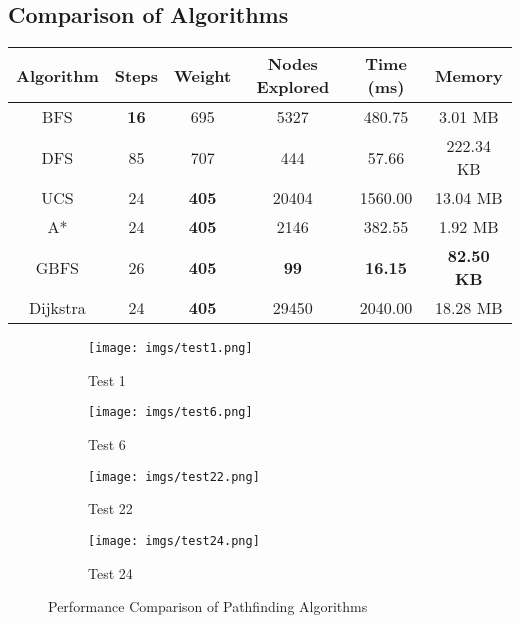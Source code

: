 \subsection{Comparison of Algorithms}

\begin{table}[h]
    \centering
    \begin{tabular}{|c|c|c|c|c|c|}
        \hline
        \textbf{Algorithm} & \textbf{Steps} & \textbf{Weight} & \textbf{Nodes Explored} & \textbf{Time (ms)} & \textbf{Memory}   \\
        \hline
        BFS                & \textbf{16}    & 695             & 5327                    & 480.75             & 3.01 MB           \\
        \hline
        DFS                & 85             & 707             & 444                     & 57.66              & 222.34 KB         \\
        \hline
        UCS                & 24             & \textbf{405}    & 20404                   & 1560.00            & 13.04 MB          \\
        \hline
        A*                 & 24             & \textbf{405}    & 2146                    & 382.55             & 1.92 MB           \\
        \hline
        GBFS               & 26             & \textbf{405}    & \textbf{99}             & \textbf{16.15}     & \textbf{82.50 KB} \\
        \hline
        Dijkstra           & 24             & \textbf{405}    & 29450                   & 2040.00            & 18.28 MB          \\
        \hline
    \end{tabular}
    \label{tab:sokoban_comparison}
\end{table}

\begin{figure}[H]
    \centering
    \begin{subfigure}{0.46\textwidth}
        \centering
        \texttt{[image: imgs/test1.png]}
        \caption{Test 1}
    \end{subfigure}
    \hfill
    \begin{subfigure}{0.46\textwidth}
        \centering
        \texttt{[image: imgs/test6.png]}
        \caption{Test 6}
    \end{subfigure}
    \vfill
    \begin{subfigure}{0.46\textwidth}
        \centering
        \texttt{[image: imgs/test22.png]}
        \caption{Test 22}
    \end{subfigure}
    \hfill
    \begin{subfigure}{0.46\textwidth}
        \centering
        \texttt{[image: imgs/test24.png]}
        \caption{Test 24}
    \end{subfigure}
    \caption{Performance Comparison of Pathfinding Algorithms}
    \label{fig:comparison}
\end{figure}


